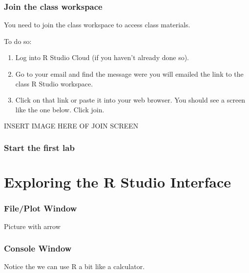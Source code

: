 \documentclass[
]{krantz}
\providecommand{\tightlist}{%
  \setlength{\itemsep}{0pt}\setlength{\parskip}{0pt}}
\begin{document}
\hypertarget{join-the-class-workspace}{%
\subsubsection{Join the class workspace}\label{join-the-class-workspace}}

You need to join the class workspace to access class materials.

To do so:

\begin{enumerate}
\def\labelenumi{\arabic{enumi}.}
\tightlist
\item
  Log into R Studio Cloud (if you haven't already done so).
\item
  Go to your email and find the message were you will emailed the link to the class R Studio workspace.
\item
  Click on that link or paste it into your web browser. You should see a screen like the one below. Click join.
\end{enumerate}

INSERT IMAGE HERE OF JOIN SCREEN

\hypertarget{start-the-first-lab}{%
\subsubsection{Start the first lab}\label{start-the-first-lab}}

\hypertarget{exploring-the-r-studio-interface}{%
\section{Exploring the R Studio Interface}\label{exploring-the-r-studio-interface}}

\hypertarget{fileplot-window}{%
\subsubsection{File/Plot Window}\label{fileplot-window}}

Picture with arrow

\hypertarget{console-window}{%
\subsubsection{Console Window}\label{console-window}}

Notice the we can use R a bit like a calculator.
\end{document}
